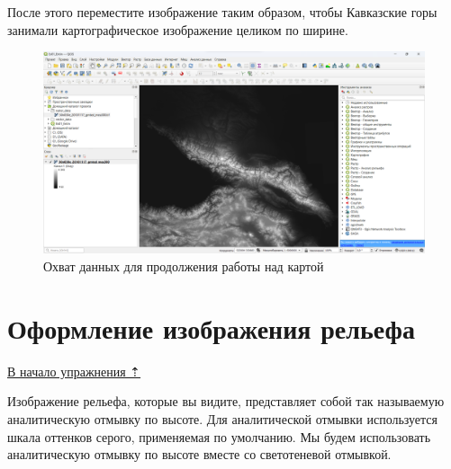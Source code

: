 \documentclass[
  12pt,
]{book}
\begin{document}
После этого переместите изображение таким образом, чтобы Кавказские горы занимали картографическое изображение целиком по ширине.

\begin{figure}
\centering
\includegraphics{images/Ex01_MapGeneral/screen_qgis_5M.png}
\caption{Охват данных для продолжения работы над картой}
\end{figure}

\hypertarget{map-design-general-relief}{%
\section{Оформление изображения рельефа}\label{map-design-general-relief}}

\protect\hyperlink{map-design-general}{В начало упражнения ⇡}

Изображение рельефа, которые вы видите, представляет собой так называемую аналитическую отмывку по высоте. Для аналитической отмывки используется шкала оттенков серого, применяемая по умолчанию. Мы будем использовать аналитическую отмывку по высоте вместе со светотеневой отмывкой.
\end{document}
